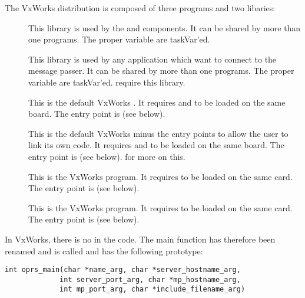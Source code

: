 The VxWorks distribution is composed of three programs and two libaries:

\begin{description}

\item [] This library is used by the  and
 components. It can be shared by more than one programs. The
proper variable are taskVar'ed.

\item [] This library is used by any application which want
to connect to the message passer. It can be shared by more than one
programs. The proper variable are taskVar'ed.  require this
library. 

\item [] This is the default VxWorks \CPK{}. It requires
 and  to be loaded on the same board. The
entry point is  (see below). 

\item [] This is the default VxWorks \CPK{} minus the
entry points to allow the user to link its own code. It requires
 and  to be loaded on the same board. The
entry point is  (see below).  for more on this.

\item [] This is the VxWorks \MPA{} program.  It requires
 to be loaded on the same card. The entry point is
 (see below).

\item [] This is the VxWorks  program.  It
requires  to be loaded on the same card. The entry point is
 (see below).


\end{description}

In VxWorks, there is no  in the code. The \COPRS{} main function has
therefore been renamed and is called  and has the following
prototype:

\begin{verbatim}
int oprs_main(char *name_arg, char *server_hostname_arg, 
             int server_port_arg, char *mp_hostname_arg, 
             int mp_port_arg, char *include_filename_arg)
\end{verbatim}

